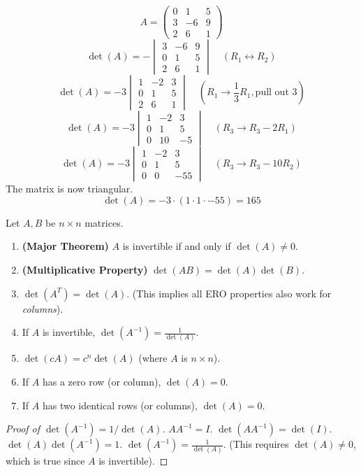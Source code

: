 \begin{example}
\[ A = \begin{pmatrix} 0 & 1 & 5 \\ 3 & -6 & 9 \\ 2 & 6 & 1 \end{pmatrix} \]
\[ \det(A) = - \begin{vmatrix} 3 & -6 & 9 \\ 0 & 1 & 5 \\ 2 & 6 & 1 \end{vmatrix} \quad (R_1 \leftrightarrow R_2) \]
\[ \det(A) = -3 \begin{vmatrix} 1 & -2 & 3 \\ 0 & 1 & 5 \\ 2 & 6 & 1 \end{vmatrix} \quad (R_1 \to \frac{1}{3}R_1, \text{pull out } 3) \]
\[ \det(A) = -3 \begin{vmatrix} 1 & -2 & 3 \\ 0 & 1 & 5 \\ 0 & 10 & -5 \end{vmatrix} \quad (R_3 \to R_3 - 2R_1) \]
\[ \det(A) = -3 \begin{vmatrix} 1 & -2 & 3 \\ 0 & 1 & 5 \\ 0 & 0 & -55 \end{vmatrix} \quad (R_3 \to R_3 - 10R_2) \]
The matrix is now triangular.
\[ \det(A) = -3 \cdot (1 \cdot 1 \cdot -55) = 165 \]
\end{example}

\begin{property}
Let $A, B$ be $n \times n$ matrices.
\begin{enumerate}
    \item \textbf{(Major Theorem)} $A$ is invertible if and only if $\det(A) \neq 0$.
    \item \textbf{(Multiplicative Property)} $\det(AB) = \det(A)\det(B)$.
    \item $\det(A^T) = \det(A)$. (This implies all ERO properties also work for \emph{columns}).
    \item If $A$ is invertible, $\det(A^{-1}) = \frac{1}{\det(A)}$.
    \item $\det(cA) = c^n \det(A)$ (where $A$ is $n \times n$).
    \item If $A$ has a zero row (or column), $\det(A) = 0$.
    \item If $A$ has two identical rows (or columns), $\det(A) = 0$.
\end{enumerate}
\end{property}
\begin{proof}[Proof of $\det(A^{-1}) = 1/\det(A)$]
$A A^{-1} = I$.
$\det(A A^{-1}) = \det(I)$.
$\det(A) \det(A^{-1}) = 1$.
$\det(A^{-1}) = \frac{1}{\det(A)}$. (This requires $\det(A) \neq 0$, which is true since $A$ is invertible).
\end{proof}


